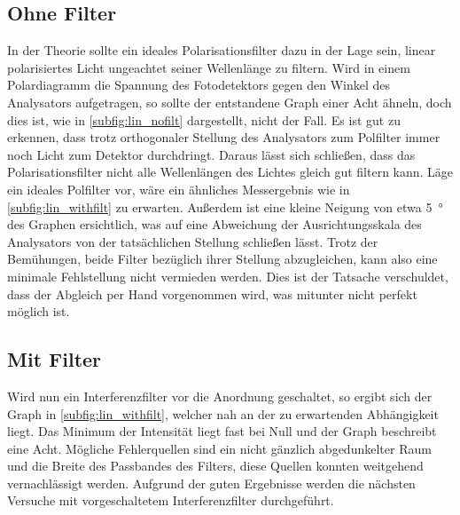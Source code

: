 \subsection{Ohne Filter}
In der Theorie sollte ein ideales Polarisationsfilter dazu in der Lage sein, linear polarisiertes Licht ungeachtet seiner Wellenlänge zu filtern.
Wird in einem Polardiagramm die Spannung des Fotodetektors gegen den Winkel des Analysators aufgetragen, so sollte der entstandene Graph einer Acht ähneln, doch dies ist, wie in \autoref{subfig:lin_nofilt} dargestellt, nicht der Fall.
Es ist gut zu erkennen, dass trotz orthogonaler Stellung des Analysators zum Polfilter immer noch Licht zum Detektor durchdringt.
Daraus lässt sich schließen, dass das Polarisationsfilter nicht alle Wellenlängen des Lichtes gleich gut filtern kann.
Läge ein ideales Polfilter vor, wäre ein ähnliches Messergebnis wie in \autoref{subfig:lin_withfilt} zu erwarten.
Außerdem ist eine kleine Neigung von etwa \SI{5}{\degree} des Graphen ersichtlich, was auf eine Abweichung der Ausrichtungsskala des Analysators von der tatsächlichen Stellung schließen lässt.
Trotz der Bemühungen, beide Filter bezüglich ihrer Stellung abzugleichen, kann also eine minimale Fehlstellung nicht vermieden werden.
Dies ist der Tatsache verschuldet, dass der Abgleich per Hand vorgenommen wird, was mitunter nicht perfekt möglich ist.

\subsection{Mit Filter}
Wird nun ein Interferenzfilter vor die Anordnung geschaltet, so ergibt sich der Graph in \autoref{subfig:lin_withfilt}, welcher nah an der zu erwartenden Abhängigkeit liegt.
Das Minimum der Intensität liegt fast bei Null und der Graph beschreibt eine Acht.
Mögliche Fehlerquellen sind ein nicht gänzlich abgedunkelter Raum und die Breite des Passbandes des Filters, diese Quellen konnten weitgehend vernachlässigt werden.
Aufgrund der guten Ergebnisse werden die nächsten Versuche mit vorgeschaltetem Interferenzfilter durchgeführt.

